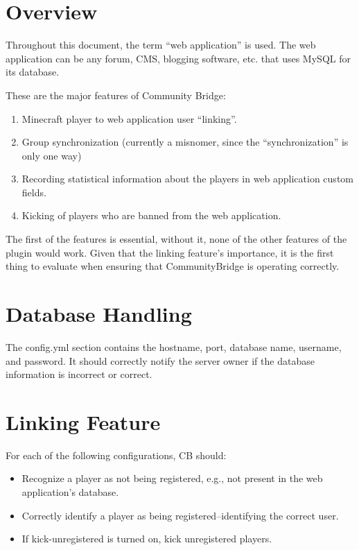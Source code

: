 \documentclass[letterpaper,12pt]{article}
\begin{document}
  \section{Overview}
  Throughout this document, the term ``web application'' is used. The web
  application can be any forum, CMS, blogging software, etc. that uses MySQL for
  its database.
  
  These are the major features of Community Bridge:
  \begin{enumerate}
    \item Minecraft player to web application user ``linking''.
    \item Group synchronization (currently a misnomer, since the
          ``synchronization'' is only one way)
    \item Recording statistical information about the players in web
          application custom fields.
    \item Kicking of players who are banned from the web application.
  \end{enumerate}
  
  The first of the features is essential, without it, none of the other
  features of the plugin would work. Given that the linking feature's
  importance, it is the first thing to evaluate when ensuring that
  CommunityBridge is operating correctly.

  \section{Database Handling}
  The config.yml section contains the hostname, port, database name, username,
  and password. It should correctly notify the server owner if the database
  information is incorrect or correct.
  
  \section{Linking Feature}
  For each of the following configurations, CB should:
  \begin{itemize}
    \item Recognize a player as not being registered, e.g., not present in the
    web application's database.
    \item Correctly identify a player as being registered--identifying the
    correct user.
    \item If kick-unregistered is turned on, kick unregistered players.
  \end{itemize}
\end{document}
